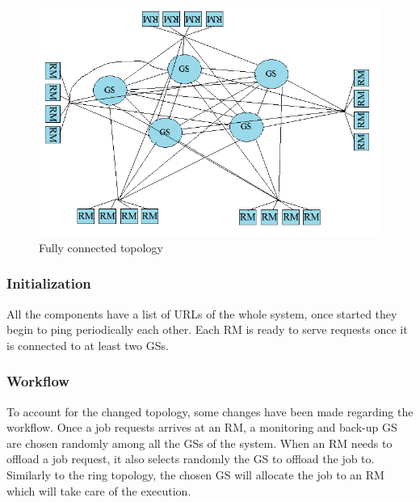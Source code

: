 \begin{figure}[H]
\centering
	\includegraphics[scale=0.51]{full.png}
	\caption{Fully connected topology}
\end{figure}

\subsubsection{Initialization}
All the components have a list of URLs of the whole system, once started they begin to ping periodically each other. Each RM is ready to serve requests once it is connected to at least two GSs.

\subsubsection{Workflow}
To account for the changed topology, some changes have been made regarding the workflow. Once a job requests arrives at an RM, a monitoring and back-up GS are chosen randomly among all the GSs of the system. When an RM needs to offload a job request, it also selects randomly the GS to offload the job to. Similarly to the ring topology, the chosen GS will allocate the job to an RM which will take care of the execution.

